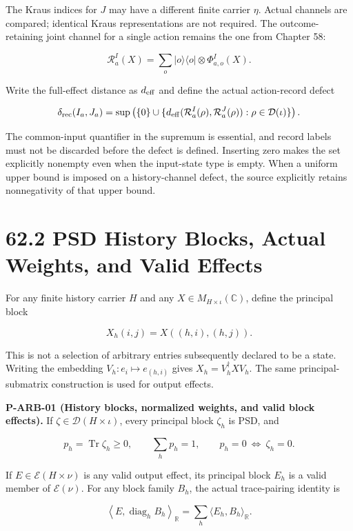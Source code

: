 \documentclass[
  11pt,
  oneside]{book}
\begin{document}
The Kraus indices for \(J\) may have a different finite carrier
\(\eta\). Actual channels are compared; identical Kraus representations
are not required. The outcome-retaining joint channel for a single
action remains the one from Chapter 58:

\[
\mathcal R^I_a(X)=\sum_o|o\rangle\langle o|\otimes\Phi^I_{a,o}(X).
\]

Write the full-effect distance as \(d_{\rm eff}\) and define the actual
action-record defect

\[
\delta_{\rm rec}(I_a,J_a)
=\sup\left(\{0\}\cup
 \{d_{\rm eff}(\mathcal R^I_a(\rho),\mathcal R^J_a(\rho)):
   \rho\in\mathcal D(\iota)\}\right).
\]

The common-input quantifier in the supremum is essential, and record
labels must not be discarded before the defect is defined. Inserting
zero makes the set explicitly nonempty even when the input-state type is
empty. When a uniform upper bound is imposed on a history-channel
defect, the source explicitly retains nonnegativity of that upper bound.

\section{62.2 PSD History Blocks, Actual Weights, and Valid Effects}

For any finite history carrier \(H\) and any
\(X\in M_{H\times\iota}(\mathbb C)\), define the principal block

\[
X_h(i,j)=X((h,i),(h,j)).
\]

This is not a selection of arbitrary entries subsequently declared to be
a state. Writing the embedding \(V_h:e_i\mapsto e_{(h,i)}\) gives
\(X_h=V_h^\dagger XV_h\). The same principal-submatrix construction is
used for output effects.

\label{p-arb-01}{}

\textbf{P-ARB-01 (History blocks, normalized weights, and valid block
effects).} If \(\zeta\in\mathcal D(H\times\iota)\), every principal
block \(\zeta_h\) is PSD, and

\[
p_h=\operatorname{Tr}\zeta_h\ge0,
\qquad \sum_h p_h=1,
\qquad p_h=0\ \Longleftrightarrow\ \zeta_h=0.
\]

If \(E\in\mathcal E(H\times\nu)\) is any valid output effect, its
principal block \(E_h\) is a valid member of \(\mathcal E(\nu)\). For
any block family \(B_h\), the actual trace-pairing identity is

\[
\left\langle E,\operatorname{diag}_hB_h\right\rangle_{\mathbb R}
=\sum_h\langle E_h,B_h\rangle_{\mathbb R}.
\]
\end{document}
